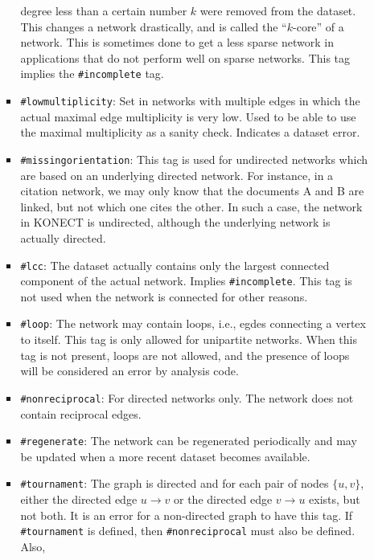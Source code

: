 \documentclass{article}
\begin{document}
\begin{itemize}
\begin{itemize}
\begin{itemize}
          degree less than a certain number $k$ were removed from the
          dataset.  This changes a network drastically, and is called
          the ``$k$-core'' of a network. This is sometimes done to get
          a less sparse network in applications that do not perform well
          on sparse networks. This tag implies the
          \texttt{\#incomplete} tag.
        \item \texttt{\#lowmultiplicity}:  Set in networks with multiple
          edges in which the actual maximal edge multiplicity is very
          low.  Used to be able to use the maximal multiplicity as a
          sanity check.  Indicates a dataset error. 
        \item \texttt{\#missingorientation}: This tag is used for
          undirected networks which are based on an underlying
          directed network.  For instance, in a citation network, we
          may only know that the documents A and B are linked, but not
          which one cites the other.  In such a case, the network in
          KONECT is undirected, although the underlying network is
          actually directed.
        \item \texttt{\#lcc}:  The dataset actually contains only the
          largest connected component of the actual network.  Implies
          \texttt{\#incomplete}.  This tag is not used when the network
          is connected for other reasons. 
        \item \texttt{\#loop}: The network may contain loops, i.e.,
          egdes connecting a vertex to itself.  This tag is only
          allowed for unipartite networks.  When this tag is not
          present, loops are not allowed, and the presence of loops
          will be considered an error by analysis code.
        \item \texttt{\#nonreciprocal}:  For directed networks only.
          The network does not contain reciprocal edges.  
	\item \texttt{\#regenerate}: The network can be regenerated
          periodically and may be updated when a more recent dataset
          becomes available.
        \item \texttt{\#tournament}:  The graph is directed and for each
          pair of nodes $\{u,v\}$, either the directed edge $u \rightarrow v$ or
          the directed edge $v \rightarrow u$ exists, but not both.  It
          is an error for a non-directed graph to have this tag.  If
          \texttt{\#tournament} is defined, then
          \texttt{\#nonreciprocal} must also be defined.  Also,

\end{itemize}
\end{itemize}
\end{itemize}
\end{document}

